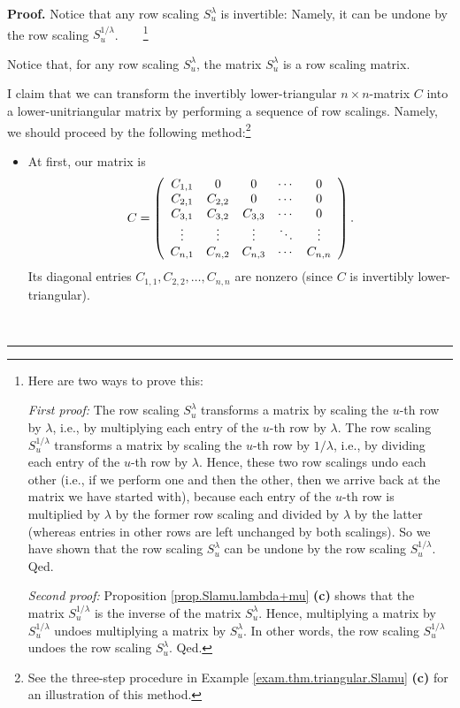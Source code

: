 \documentclass[numbers=enddot,12pt,final,onecolumn,notitlepage]{scrartcl}%
\theoremstyle{definition}
\newenvironment{proof}[1][Proof]{\noindent\textbf{#1.} }{\ \rule{0.5em}{0.5em}}
\begin{document}
\begin{proof}
Notice that any row scaling $S_{u}^{\lambda}$ is invertible: Namely, it can be
undone by the row scaling $S_{u}^{1/\lambda}$.\ \ \ \ \footnote{Here are two
ways to prove this:
\par
\textit{First proof:} The row scaling $S_{u}^{\lambda}$ transforms a matrix by
scaling the $u$-th row by $\lambda$, i.e., by multiplying each entry of the
$u$-th row by $\lambda$. The row scaling $S_{u}^{1/\lambda}$ transforms a
matrix by scaling the $u$-th row by $1/\lambda$, i.e., by dividing each entry
of the $u$-th row by $\lambda$. Hence, these two row scalings undo each other
(i.e., if we perform one and then the other, then we arrive back at the matrix
we have started with), because each entry of the $u$-th row is multiplied by
$\lambda$ by the former row scaling and divided by $\lambda$ by the latter
(whereas entries in other rows are left unchanged by both scalings). So we
have shown that the row scaling $S_{u}^{\lambda}$ can be undone by the row
scaling $S_{u}^{1/\lambda}$. Qed.
\par
\textit{Second proof:} Proposition \ref{prop.Slamu.lambda+mu} \textbf{(c)}
shows that the matrix $S_{u}^{1/\lambda}$ is the inverse of the matrix
$S_{u}^{\lambda}$. Hence, multiplying a matrix by $S_{u}^{1/\lambda}$ undoes
multiplying a matrix by $S_{u}^{\lambda}$. In other words, the row scaling
$S_{u}^{1/\lambda}$ undoes the row scaling $S_{u}^{\lambda}$. Qed.}

Notice that, for any row scaling $S_{u}^{\lambda}$, the matrix $S_{u}%
^{\lambda}$ is a row scaling matrix.

I claim that we can transform the invertibly lower-triangular $n\times
n$-matrix $C$ into a lower-unitriangular matrix by performing a sequence of
row scalings. Namely, we should proceed by the following method:\footnote{See
the three-step procedure in Example \ref{exam.thm.triangular.Slamu}
\textbf{(c)} for an illustration of this method.}

\begin{itemize}
\item At first, our matrix is
\[
C=\left(
\begin{array}
[c]{ccccc}%
C_{1,1} & 0 & 0 & \cdots & 0\\
C_{2,1} & C_{2,2} & 0 & \cdots & 0\\
C_{3,1} & C_{3,2} & C_{3,3} & \cdots & 0\\
\vdots & \vdots & \vdots & \ddots & \vdots\\
C_{n,1} & C_{n,2} & C_{n,3} & \cdots & C_{n,n}%
\end{array}
\right)  .
\]
Its diagonal entries $C_{1,1},C_{2,2},\ldots,C_{n,n}$ are nonzero (since $C$
is invertibly lower-triangular).


\end{itemize}
\end{proof}
\end{document}
